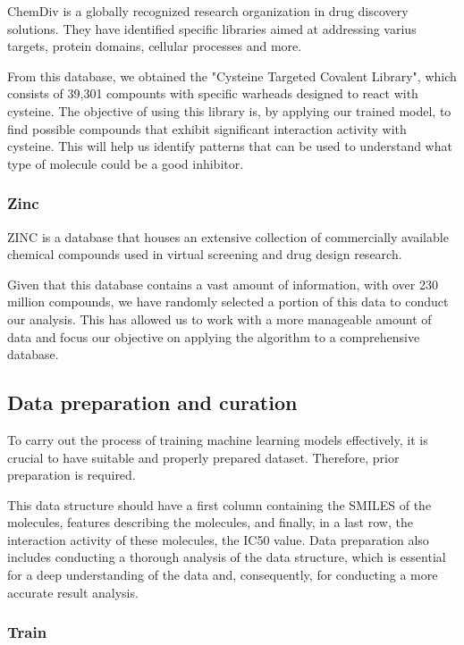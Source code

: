 \documentclass[final,times,twocolumn,article]{elsarticle}
\begin{document}
ChemDiv is a globally recognized research organization in drug discovery solutions. They have identified specific libraries aimed at addressing varius targets, protein domains, cellular processes and more. \cite{chemdivweb}

From this database, we obtained the "Cysteine Targeted Covalent Library", which consists of 39,301 compounts with specific warheads designed to react with cysteine. The objective of using this library is, by applying our trained model, to find possible compounds that exhibit significant interaction activity with cysteine. This will help us identify patterns that can be used to understand what type of molecule could be a good inhibitor. 

\subsubsection{Zinc}

ZINC is a database that houses an extensive collection of commercially available chemical compounds used in virtual screening and drug design research. \cite{Zinc}

Given that this database contains a vast amount of information, with over 230 million compounds, we have randomly selected a portion of this data to conduct our analysis. This has allowed us to work with a more manageable amount of data and focus our objective on applying the algorithm to a comprehensive database.


\subsection{Data preparation and curation}

To carry out the process of training machine learning models effectively, it is crucial to have suitable and properly prepared dataset. Therefore, prior preparation is required. 

This data structure should have a first column containing the SMILES of the molecules, features describing the molecules, and finally, in a last row, the interaction activity of these molecules, the IC50 value. Data preparation also includes conducting a thorough analysis of the data structure, which is essential for a deep understanding of the data and, consequently, for conducting a more accurate result analysis. 

\subsubsection{Train}
\end{document}
